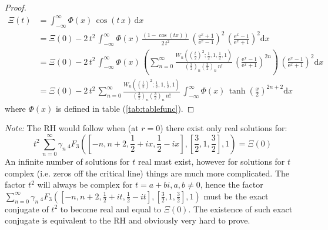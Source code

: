 \documentclass[a4paper,11pt,twoside]{amsart}
\newcommand{\verifiedeq}{=}
\newcommand{\verifiedeq}{\stackrel{\checkmark}{=}}
\begin{document}
\begin{proof}
\begin{align}
 \Xi(t) &\verifiedeq \int_{-\infty}^\infty \Phi(x)\,\cos(t\,x)\, \mathrm{d}x \\
  &\verifiedeq\Xi(0)- 2\,t^2\, \int_{-\infty}^\infty \Phi(x)\, \frac{(1-\cos(tx))}{2\,t^2}\,\left(\frac{\textrm{e}^x+1}{\textrm{e}^x-1}\right)^2\,\left(\frac{\textrm{e}^x-1}{\textrm{e}^x+1}\right)^2 \mathrm{d}x\\
  &\verifiedeq\Xi(0)- 2\,t^2\, \int_{-\infty}^\infty \Phi(x)\,\left(\sum_{n=0}^\infty\frac{W_n\left(\left(\frac{t}{2}\right)^2;\frac12,1,\frac12,1\right)}{\left(\frac32\right)_n\left(\frac32\right)_n\,n!}\, \left(\frac{\textrm{e}^x-1}{\textrm{e}^x+1}\right)^{2n}\right)\,\left(\frac{\textrm{e}^x-1}{\textrm{e}^x+1}\right)^2 \mathrm{d}x \\
  &\verifiedeq\Xi(0)- 2\,t^2\, \sum_{n=0}^\infty \frac{W_n\left(\left(\frac{t}{2}\right)^2;\frac12,1,\frac12,1\right)}{\left(\frac32\right)_n\left(\frac32\right)_n\,n!}\,\int_{-\infty}^\infty \Phi(x)\,\tanh\left(\frac{x}{2}\right)^{2n+2} \mathrm{d}x
\end{align}
where $\Phi(x)$ is defined in table (\ref{tab:tablefunc}).
\end{proof} 
\textit{Note:} The RH would follow when (at $r=0$) there exist only real solutions for:
\begin{equation}
  t^2\,\sum_{n=0}^{\infty} \gamma_n\, {}_4F_3\left(\left[-n, n+2,\frac12+ix, \frac12- ix\right],\left[\frac32, 1, \frac32\right], 1\right) \verifiedeq \Xi(0)
\end{equation}
An infinite number of solutions for $t$ real must exist, however for solutions for $t$ complex (i.e. zeros off the critical line) things are much more complicated. The factor $t^2$ will always be complex for $t=a+bi, a,b \ne 0$, hence the factor $\sum_{n=0}^{\infty} \gamma_n\, {}_4F_3\left(\left[-n, n+2,\frac12+it, \frac12- it\right],\left[\frac32, 1, \frac32\right], 1\right)$ must be the exact conjugate of $t^2$ to become real and equal to $\Xi(0)$. The existence of such exact conjugate is equivalent to the RH and obviously very hard to prove.  
\end{document}

